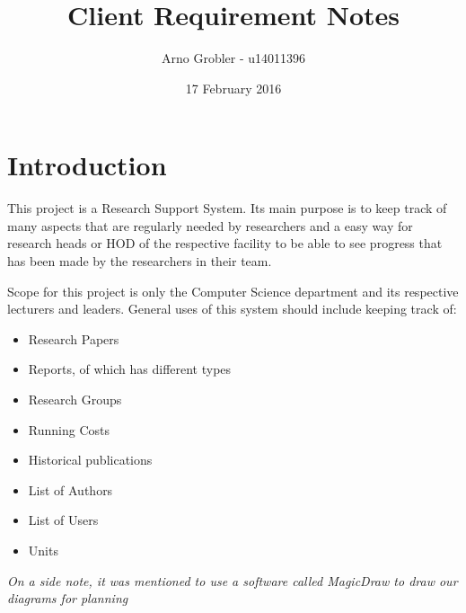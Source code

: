 \documentclass[12pt, letterpaper, twoside]{article}
\title{Client Requirement Notes}
\author{Arno Grobler - u14011396}
\date{17 February 2016}
\begin{document}
 
\begin{titlepage}
\maketitle
\end{titlepage}
 
\tableofcontents
\newpage

\section{Introduction}

This project is a Research Support System. Its main purpose is to keep track of many aspects that are regularly needed by researchers and a easy way for research heads or HOD of the respective facility to be able to see progress that has been made by the researchers in their team.

Scope for this project is only the Computer Science department and its respective lecturers and leaders.
General uses of this system should include keeping track of:
\begin{itemize}  

    \item Research Papers

    \item Reports, of which has different types
    \item Research Groups
    \item Running Costs
    \item Historical publications
    \item List of Authors
    \item List of Users
    \item Units 

\end{itemize}
{\textit{On a side note, it was mentioned to use a software called MagicDraw to draw our diagrams for planning}}
\end{document}
